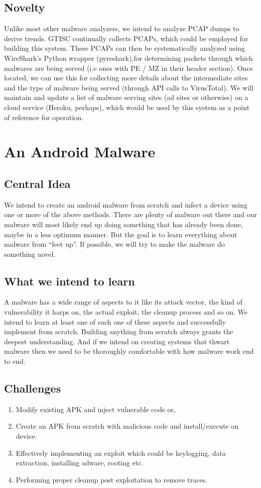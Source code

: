 \documentclass[a4paper]{article}
\begin{document}
\subsection{Novelty}
Unlike most other malware analyzers, we intend to analyze PCAP dumps to derive trends. GTISC continually collects PCAPs, which could be employed for building this system. These PCAPs can then be systematically analyzed using WireShark's Python wrapper (pyreshark),for determining packets through which malwares are being served (i.e ones with PE / MZ in their header section). Once located, we can use this for collecting more details about the intermediate sites and the type of malware being served (through API calls to VirusTotal). We will maintain and update a list of malware serving sites (ad sites or otherwise) on a cloud service (Heroku, perhaps), which would be used by this system as a point of reference for operation.

\section{An Android Malware}
\subsection{Central Idea}
We intend to create an android malware from scratch and infect a device using one or more of the above methods. There are plenty of malware out there and our malware will most likely end up doing something that has already been done, maybe in a less optimum manner. But the goal is to learn everything about malware from “feet up”. If possible, we will try to make the malware do something novel.

\subsection{What we intend to learn}
A malware has a wide range of aspects to it like its attack vector, the kind of vulnerability it harps on, the actual exploit, the cleanup process and so on. We intend to learn at least one of each one of these aspects and successfully implement from scratch. Building anything from scratch always grants the deepest understanding. And if we intend on creating systems that thwart malware then we need to be thoroughly comfortable with how malware work end to end.

\subsection{Challenges}
\begin{enumerate}
\item Modify existing APK and inject vulnerable code or,
\item Create an APK from scratch with malicious code and install/execute on device.
\item Effectively implementing an exploit which could be keylogging, data extraction, installing adware, rooting etc.
\item Performing proper cleanup post exploitation to remove traces.
\end{enumerate}
\end{document}

